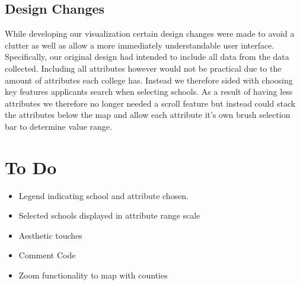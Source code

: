 \documentclass[11pt, a4paper]{article}
\begin{document}
\subsection{Design Changes}
While developing our visualization certain design changes were made to avoid a clutter as well as allow a more immediately understandable user interface. Specifically, our original design had intended to include all data from the data collected. Including all attributes however would not be practical due to the amount of attributes each college has. Instead we therefore sided with choosing key features applicants search when selecting schools. As a result of having less attributes we therefore no longer needed a scroll feature but instead could stack the attributes below the map and allow each attribute it's own brush selection bar to determine value range.

\section{To Do}
\begin{itemize}
\item Legend indicating school and attribute chosen.
\item Selected schools displayed in attribute range scale
\item Aesthetic touches
\item Comment Code
\item Zoom functionality to map with counties 
\end{itemize}
\end{document}
